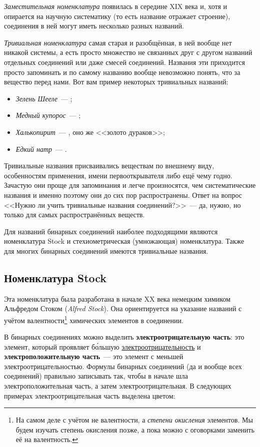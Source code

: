 \emph{Заместительная номенклатура} появилась в середине XIX века и, хотя и опирается на научную систематику (то есть название отражает строение), соединения в ней могут иметь несколько разных названий.

\emph{Тривиальная номенклатура} самая старая и разобщённая, в ней вообще нет никакой системы, а есть просто множество не связанных друг с другом названий отдельных соединений или даже смесей соединений. Названия эти приходится просто запоминать и по самому названию вообще невозможно понять, что за вещество перед нами. Вот вам пример некоторых тривиальных названий:

\begin{itemize}
    \item \textit{Зелень Шееле}~--- ;
    \item \textit{Медный купорос}~--- ;
    \item \textit{Халькопирит}~--- , оно же <<золото дураков>>;
    \item \textit{Едкий натр}~--- .
\end{itemize}

Тривиальные названия присваивались веществам по внешнему виду, особенностям применения, имени первооткрывателя либо ещё чему годно. Зачастую они проще для запоминания и легче произносятся, чем систематические названия и именно поэтому они до сих пор распространены. Ответ на вопрос <<Нужно ли учить тривиальные названия соединений?>>~--- да, нужно, но только для самых распространённых веществ.


Для названий бинарных соединений наиболее подходящими являются номенклатура Stock и стехиометрическая (умножающая) номенклатура. Также для многих бинарных соединений имеются тривиальные названия.

\subsection*{Номенклатура Stock}

Эта номенклатура была разработана в начале XX века немецким химиком Альфредом Стоком (\textit{Alfred Stock}). Она ориентируется на указание названий с учётом валентности\footnote{На самом деле с учётом не валентности, а \emph{степени окисления} элементов. Мы будем изучать степень окисления позже, а пока можно с оговорками заменить её на валентность.} химических элементов в соединении.

В бинарных соединениях можно выделить \textbf{электроотрицательную часть}: это элемент, который проявляет б\'{о}льшую \hyperref[sec:electronegativity]{электроотрицательность} и \textbf{электроположительную часть}~--- это элемент с меньшей электроотрицательностью. Формулы бинарных соединений (да и вообще всех соединений) правильно записывать так, чтобы в начале шла электроположительная часть, а затем электроотрицательная. В следующих примерах электроотрицательная часть выделена цветом:

